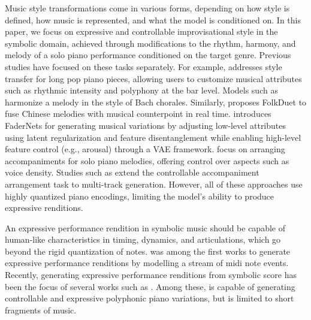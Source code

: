 Music style transformations come in various forms, depending on how style is defined, how music is represented, and what the model is conditioned on. In this paper, we focus on expressive and controllable improvisational style in the symbolic domain, achieved through modifications to the rhythm, harmony, and melody of a solo piano performance conditioned on the target genre. Previous studies have focused on these tasks separately. For example, \cite{wu2023musemorphose} addresses style transfer for long pop piano pieces, allowing users to customize musical attributes such as rhythmic intensity and polyphony at the bar level. Models such as \cite{hadjeres2017deepbach,huang2019counterpoint} harmonize a melody in the style of Bach chorales. Similarly, \cite{jiang2020counterpoint} proposes FolkDuet to fuse Chinese melodies with musical counterpoint in real time. \cite{tan2020music} introduces FaderNets for generating musical variations by adjusting low-level attributes using latent regularization and feature disentanglement while enabling high-level feature control (e.g., arousal) through a VAE framework. \cite{zhao2021accomontage,wu2024generating} focus on arranging accompaniments for solo piano melodies, offering control over aspects such as voice density. Studies such as \cite{lv2023getmusic,ren2020popmag,zhaostructured,wu2023c2,min2023polyffusion,cifka2020groove2groove} extend the controllable accompaniment arrangement task to multi-track generation. However, all of these approaches use highly quantized piano encodings, limiting the model's ability to produce expressive renditions.

An expressive performance rendition in symbolic music should be capable of human-like characteristics in timing, dynamics, and articulations, which go beyond the rigid quantization of notes. \cite{performance-rnn-2017} was among the first works to generate expressive performance renditions by modelling a stream of midi note events. Recently, generating expressive performance renditions from symbolic score has been the focus of several works such as \cite{jeong2019graph,jeong2019virtuosonet,xiao2024music,borovik2023scoreperformer,maezawa2019rendering,lenz2024pertok,colton2024automatic}. Among these, \cite{lenz2024pertok} is capable of generating controllable and expressive polyphonic piano variations, but is limited to short fragments of music. 

